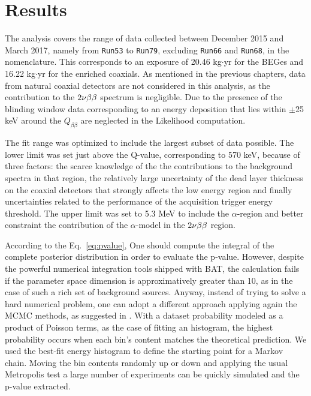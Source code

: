 \section{Results}\label{sec:results}
The analysis covers the range of data collected between December 2015 and March 2017, namely from \texttt{Run53} to \texttt{Run79}, excluding \texttt{Run66} and \texttt{Run68}, in the {\gerda} nomenclature. This corresponds to an exposure of 20.46 kg$\cdot$yr for the BEGes and 16.22 kg$\cdot$yr for the enriched coaxials. As mentioned in the previous chapters, data from natural coaxial detectors are not considered in this analysis, as the contribution to the $2\nu\beta\beta$ spectrum is negligible. Due to the presence of the blinding window data corresponding to an energy deposition that lies within $\pm$25 keV around the $Q_{\beta\beta}$ are neglected in the Likelihood computation.

The fit range was optimized to include the largest subset of data possible. The lower limit was set just above the  Q-value, corresponding to 570 keV, because of three factors: the scarce knowledge of the the contributions to the background spectra in that region, the relatively large uncertainty of the dead layer thickness on the coaxial detectors that strongly affects the low energy region and finally uncertainties related to the performance of the acquisition trigger energy threshold. The upper limit was set to 5.3 MeV to include the $\alpha$-region and better constraint the contribution of the $\alpha$-model in the $2\nu\beta\beta$ region.

 According to the Eq.~\ref{eq:pvalue}, One should compute the integral of the complete posterior distribution in order to evaluate the p-value. However, despite the powerful numerical integration tools shipped with BAT, the calculation fails if the parameter space dimension is approximatively greater than 10, as in the case of such a rich set of background sources. Anyway, instead of trying to solve a hard numerical problem, one can adopt a different approach applying again the MCMC methods, as suggested in \cite{p-value}. With a dataset probability modeled as a product of Poisson terms, as the case of fitting an histogram, the highest probability occurs when each bin's content matches the theoretical prediction. We used the best-fit energy histogram to define the starting point for a Markov chain. Moving the bin contents randomly up or down and applying the usual Metropolis test a large number of experiments can be quickly simulated and the p-value extracted.

